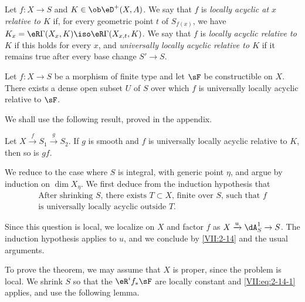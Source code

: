 \begin{definition_}\label{VII:2-12}
Let $f:X\to S$ and $K\in \ob\eD^+(X,A)$. We say that $f$ is \emph{locally
acyclic at $x$ relative to $K$} if, for every geometric point $t$ of
$S_{f(x)}$, we have $K_x=\eR\Gamma(X_x,K)\iso \eR\Gamma(X_{x,t},K)$. We say
that $f$ is \emph{locally acyclic relative to $K$} if this holds for every
$x$, and \emph{universally locally acyclic relative to $K$} if it remains true
after every base change $S' \to S$.
\end{definition_}





\begin{theorem_}\label{VII:2-13}
Let $f:X\to S$ be a morphism of finite type and let $\sF$ be constructible on
$X$. There exists a dense open subset $U$ of $S$ over which $f$ is universally
locally acyclic relative to $\sF$.
\end{theorem_}

We shall use the following result, proved in the appendix.





\begin{lemma_}\label{VII:2-14}
Let $X\xrightarrow f S_1 \xrightarrow g S_2$. If $g$ is smooth and $f$ is
universally locally acyclic relative to $K$, then so is $g f$.
\end{lemma_}

We reduce to the case where $S$ is integral, with generic point $\eta$, and
argue by induction on $\dim{X_\eta}$. We first deduce from the induction
hypothesis that
\begin{equation*}\tag{A}\label{VII:eq:2-14-1}
  \begin{array}{c}
    \text{After shrinking $S$, there exists $T\subset X$, finite over $S$, such that $f$} \\
    \text{is universally locally acyclic outside $T$.} 
  \end{array}
\end{equation*}

Since this question is local, we localize on $X$ and factor $f$ as
$X\xrightarrow u \dA_S^1 \to S$. The induction hypothesis applies
to $u$, and we conclude by \ref{VII:2-14} and the usual arguments.

To prove the theorem, we may assume that $X$ is proper, since the problem is
local. We shrink $S$ so that the $\eR^i f_\ast \sF$ are locally constant and
\eqref{VII:eq:2-14-1} applies, and use the following lemma.





